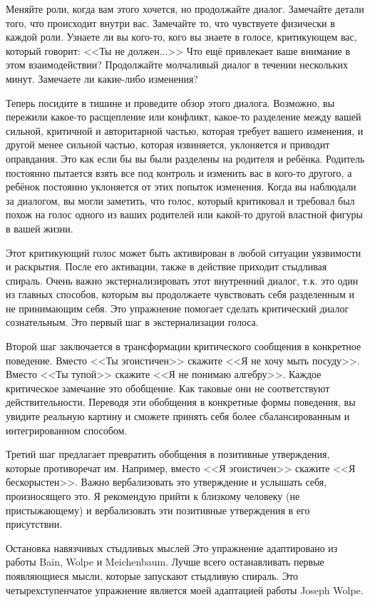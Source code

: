 \documentclass[10pt, fleqn]{article}
\begin{document}
Меняйте роли, когда вам этого хочется, но продолжайте диалог. Замечайте детали того, что происходит внутри вас. Замечайте то, что чувствуете физически в каждой роли. Узнаете ли вы кого-то, кого вы знаете в голосе, критикующем вас, который говорит: <<Ты не должен...>> Что ещё привлекает ваше внимание в этом взаимодействии? Продолжайте молчаливый диалог в течении нескольких минут. Замечаете ли какие-либо изменения?

Теперь посидите в тишине и проведите обзор этого диалога. Возможно, вы пережили какое-то расщепление или конфликт, какое-то разделение между вашей сильной, критичной и авторитарной частью, которая требует вашего изменения, и другой менее сильной частью, которая извиняется, уклоняется и приводит оправдания. Это как если бы вы были разделены на родителя и ребёнка. Родитель постоянно пытается взять все под контроль и изменить вас в кого-то другого, а ребёнок постоянно уклоняется от этих попыток изменения. Когда вы наблюдали за диалогом, вы могли заметить, что голос, который критиковал и требовал был похож на голос одного из ваших родителей или какой-то другой властной фигуры в вашей жизни.

Этот критикующий голос может быть активирован в любой ситуации уязвимости и раскрытия. После его активации, также в действие приходит стыдливая спираль. Очень важно экстернализировать этот внутренний диалог, т.к. это один из главных способов, которым вы продолжаете чувствовать себя разделенным и не принимающим себя. Это упражнение помогает сделать критический диалог сознательным. Это первый шаг в экстернализации голоса.

Второй шаг заключается в трансформации критического сообщения в конкретное поведение. Вместо <<Ты эгоистичен>> скажите <<Я не хочу мыть посуду>>. Вместо <<Ты тупой>> скажите <<Я не понимаю алгебру>>. Каждое критическое замечание это обобщение. Как таковые они не соответствуют действительности. Переводя эти обобщения в конкретные формы поведения, вы увидите реальную картину и сможете принять себя более сбалансированным и интегрированном способом.

Третий шаг предлагает превратить обобщения в позитивные утверждения, которые противоречат им. Например, вместо <<Я эгоистичен>> скажите <<Я бескорыстен>>. Важно вербализовать это утверждение и услышать себя, произносящего это. Я рекомендую прийти к близкому человеку (не пристыжающему) и вербализовать эти позитивные утверждения в его присутствии.

Остановка навязчивых стыдливых мыслей
Это упражнение адаптировано из работы Bain, Wolpe и Meichenbaum. Лучше всего останавливать первые появляющиеся мысли, которые запускают стыдливую спираль. Это четырехступенчатое упражнение является моей адаптацией работы Joseph Wolpe.
\end{document}
